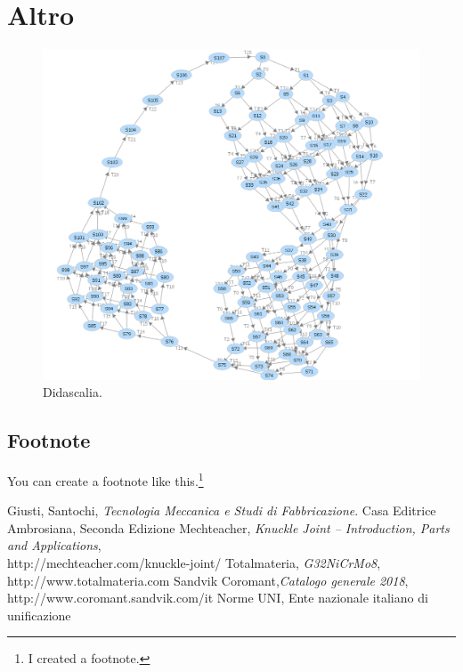 \documentclass{FR16}
\begin{document}
\section{Altro}
\begin{figure}[H]
\centering
\includegraphics[width=1\textwidth]{grafo.png}
\caption{\label{fig:1}Didascalia.}
\end{figure}
\subsection{Footnote}
You can create a footnote like this.\footnote{I created a footnote.}



\newpage
\begin{thebibliography}{9}
Giusti, Santochi, \emph{Tecnologia Meccanica e Studi di Fabbricazione}. Casa Editrice Ambrosiana, Seconda Edizione
Mechteacher, \emph{Knuckle Joint – Introduction, Parts and Applications},\\ http://mechteacher.com/knuckle-joint/
Totalmateria, \emph{G32NiCrMo8}, http://www.totalmateria.com 
Sandvik Coromant,\emph{Catalogo  generale  2018},   http://www.coromant.sandvik.com/it
Norme UNI, Ente nazionale italiano di unificazione
\end{thebibliography}
\end{document}
